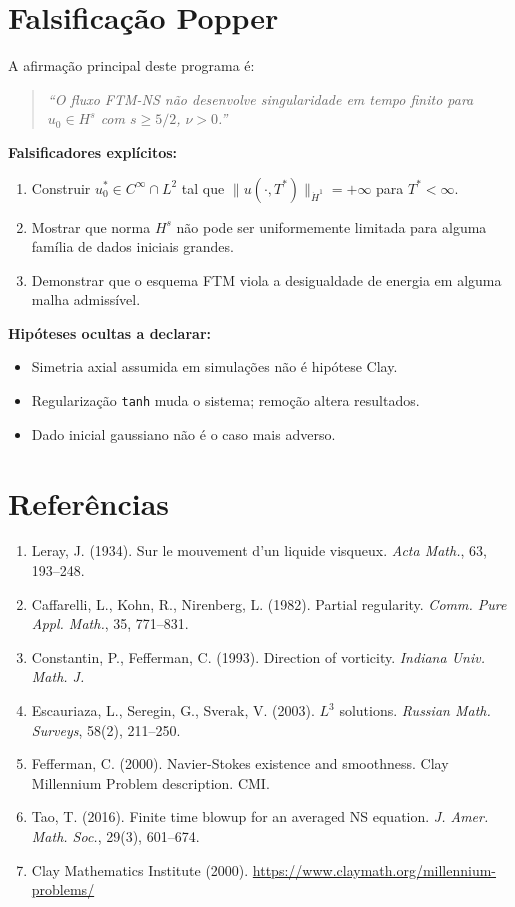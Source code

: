 \documentclass[12pt,a4paper]{article}
\theoremstyle{definition}
\begin{document}
\section{Falsificação Popper}\label{sec:falsificacao}

A afirmação principal deste programa é:

\begin{quote}
\emph{``O fluxo FTM-NS não desenvolve singularidade em tempo finito
para $u_0 \in H^s$ com $s \ge 5/2$, $\nu > 0$.''}
\end{quote}

\textbf{Falsificadores explícitos:}
\begin{enumerate}
  \item Construir $u_0^* \in C^\infty \cap L^2$ tal que
        $\|u(\cdot,T^*)\|_{\dot H^1} = +\infty$ para $T^* < \infty$.
  \item Mostrar que norma $H^s$ não pode ser uniformemente limitada
        para alguma família de dados iniciais grandes.
  \item Demonstrar que o esquema FTM viola a desigualdade de energia
        em alguma malha admissível.
\end{enumerate}

\textbf{Hipóteses ocultas a declarar:}
\begin{itemize}
  \item Simetria axial assumida em simulações não é hipótese Clay.
  \item Regularização \texttt{tanh} muda o sistema; remoção altera resultados.
  \item Dado inicial gaussiano não é o caso mais adverso.
\end{itemize}

\section*{Referências}

\begin{enumerate}
  \item Leray, J. (1934). Sur le mouvement d'un liquide visqueux.
        \emph{Acta Math.}, 63, 193--248.
  \item Caffarelli, L., Kohn, R., Nirenberg, L. (1982).
        Partial regularity. \emph{Comm. Pure Appl. Math.}, 35, 771--831.
  \item Constantin, P., Fefferman, C. (1993). Direction of vorticity.
        \emph{Indiana Univ. Math. J.}
  \item Escauriaza, L., Seregin, G., Sverak, V. (2003). $L^3$ solutions.
        \emph{Russian Math. Surveys}, 58(2), 211--250.
  \item Fefferman, C. (2000). Navier-Stokes existence and smoothness.
        Clay Millennium Problem description. CMI.
  \item Tao, T. (2016). Finite time blowup for an averaged NS equation.
        \emph{J. Amer. Math. Soc.}, 29(3), 601--674.
  \item Clay Mathematics Institute (2000).
        \url{https://www.claymath.org/millennium-problems/}
\end{enumerate}
\end{document}
